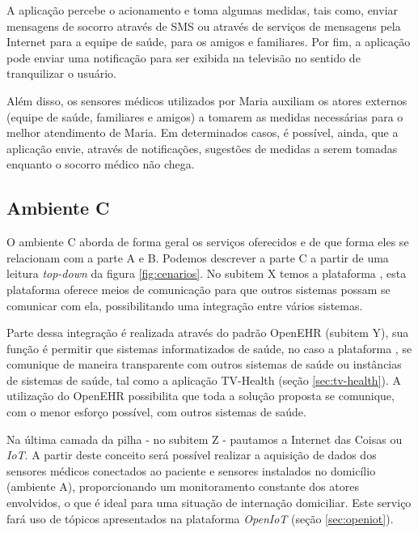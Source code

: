 A aplicação percebe o acionamento e toma algumas medidas, tais como, enviar
mensagens de socorro através de SMS ou através de serviços de mensagens pela
Internet para a equipe de saúde, para os amigos e familiares.  Por fim, a
aplicação pode enviar uma notificação para ser exibida na televisão no sentido
de tranquilizar o usuário.

Além disso, os sensores médicos utilizados por Maria auxiliam os atores
externos (equipe de saúde, familiares e amigos) a tomarem as medidas
necessárias para o melhor atendimento de Maria.  Em determinados casos, é
possível, ainda, que a aplicação envie, através de notificações, sugestões de
medidas a serem tomadas enquanto o socorro médico não chega.

\subsection{Ambiente C} \label{subsec:ambiente-c}

O ambiente C aborda de forma geral os serviços oferecidos e de que forma eles se
relacionam com a parte A e B. Podemos descrever a parte C a partir de uma leitura 
\textit{top-down} da figura \ref{fig:cenarios}. No subitem X temos a plataforma
\nextsaude[], esta plataforma oferece meios de comunicação para que outros sistemas
possam se comunicar com ela, possibilitando uma integração entre vários sistemas.

Parte dessa integração é realizada através do padrão OpenEHR (subitem Y), sua 
função é permitir que sistemas informatizados de saúde, no caso a plataforma
\nextsaude[], se comunique de maneira transparente com outros sistemas de saúde ou
instâncias de sistemas de saúde, tal como a aplicação TV-Health (seção
\vref{sec:tv-health}). A utilização do OpenEHR possibilita que toda a solução
proposta se comunique, com o menor esforço possível, com outros sistemas de 
saúde.

Na última camada da pilha - no subitem Z - pautamos a Internet das Coisas ou
\textit{IoT}. A partir deste conceito será possível realizar a aquisição de
dados dos sensores médicos conectados ao paciente e sensores instalados no domicílio
(ambiente A), proporcionando um monitoramento constante dos atores envolvidos, 
o que é ideal para uma situação de internação domiciliar. Este serviço fará uso 
de tópicos apresentados na plataforma \textit{OpenIoT}
(seção \vref{sec:openiot}).


